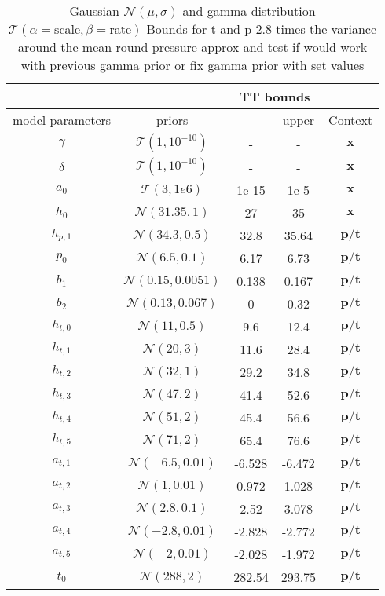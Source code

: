\begin{table}
	\centering
\begin{tabular}{ |c||c|c|c|c|   }
	\hline
	& &\multicolumn{2}{|c|}{TT bounds}&\\
	\hline
	model parameters& priors&\makecell{lower}& \makecell{upper\\
	}&Context\\
	\hline

	$\gamma$ & $\mathcal{T}(1,10^{-10})$ &- &-& $\bm{x}$\\ \hhline{|=||=|=|=|=|}
	$\delta$ &$\mathcal{T}(1,10^{-10})$ & -&-& $\bm{x}$\\ \hline
	$a_0$ &  $\mathcal{T}(3,1e6)$& 1e-15&1e-5&$\bm{x}$\\ \hline
	$h_0$ &  $\mathcal{N}(31.35,1)$&27 &35&$\bm{x}$\\ \hline
	$h_{p,1}$ &  $\mathcal{N}(34.3,0.5)$& 32.8&35.64&$\bm{p/t}$\\ \hline
	$p_0$ &  $\mathcal{N}(6.5,0.1)$&6.17 &6.73&$\bm{p/t}$\\ \hline
	$b_1$ &  $\mathcal{N}(0.15,0.0051)$& 0.138  &0.167&$\bm{p/t}$\\ \hline
	$b_2$ & $\mathcal{N}(0.13,0.067)$& 0&0.32&$\bm{p/t}$\\ \hline
	$h_{t,0}$ &  $\mathcal{N}(11,0.5)$&9.6 &12.4&$\bm{p/t}$\\ \hline
	$h_{t,1}$ &  $\mathcal{N}(20,3)$&11.6 &28.4&$\bm{p/t}$\\ \hline
	$h_{t,2}$ &  $\mathcal{N}(32,1)$&29.2 &34.8&$\bm{p/t}$\\ \hline
	$h_{t,3}$ &  $\mathcal{N}(47,2)$&41.4 &52.6&$\bm{p/t}$\\ \hline
	$h_{t,4}$ &  $\mathcal{N}(51,2)$&45.4 &56.6&$\bm{p/t}$\\ \hline
	$h_{t,5}$ &  $\mathcal{N}(71,2)$&65.4 &76.6&$\bm{p/t}$\\ \hline
	$a_{t,1}$ &  $\mathcal{N}(-6.5,0.01)$&-6.528 &-6.472&$\bm{p/t}$\\ \hline
	$a_{t,2}$ &  $\mathcal{N}(1,0.01)$&0.972 &1.028&$\bm{p/t}$\\ \hline
	$a_{t,3}$ &  $\mathcal{N}(2.8,0.1)$&2.52 &3.078&$\bm{p/t}$\\ \hline
	$a_{t,4}$ &  $\mathcal{N}(-2.8,0.01)$&-2.828 &-2.772&$\bm{p/t}$\\ \hline
	$a_{t,5}$ & $\mathcal{N}(-2,0.01)$ &-2.028 &-1.972&$\bm{p/t}$\\ \hline
	$t_{0}$ &  $\mathcal{N}(288,2)$& 282.54 &293.75&$\bm{p/t}$\\
	\hline
\end{tabular}
\caption{Gaussian $\mathcal{N}(\mu,\sigma)$ and gamma distribution $\mathcal{T}(\alpha = \text{scale}, \beta = \text{rate})$
	Bounds for t and p 2.8 times the variance around the mean
round pressure approx and  test if would work with previous gamma prior or fix gamma prior with set values}
\label{tab:1}
\end{table}

